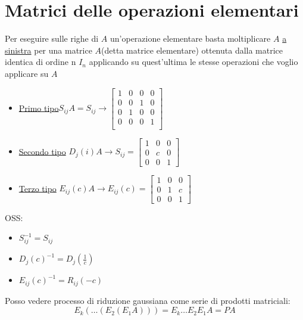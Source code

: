 \section{Matrici delle operazioni elementari}
Per eseguire sulle righe di $A$ un'operazione elementare basta moltiplicare $A$ \underline{a sinistra} per una matrice $A$(detta matrice elementare) ottenuta dalla matrice identica di ordine n $I_n$ applicando su quest'ultima le stesse operazioni che voglio applicare su $A$
\begin{itemize}
	\item \underline{Primo tipo}$S_{ij}A = S_{ij} \rightarrow
		      \begin{bmatrix}
			      1 & 0 & 0 & 0 \\
			      0 & 0 & 1 & 0 \\
			      0 & 1 & 0 & 0 \\
			      0 & 0 & 0 & 1 \\
		      \end{bmatrix} $
	\item \underline{Secondo tipo} $D_j\left( i \right) A \rightarrow S_{ij}=
		      \begin{bmatrix}
			      1 & 0 & 0 \\
			      0 & c & 0 \\
			      0 & 0 & 1
		      \end{bmatrix} $
	\item \underline{Terzo tipo} $E_{ij}\left( c \right) A \rightarrow E_{ij}\left( c \right) =
		      \begin{bmatrix}
			      1 & 0 & 0 \\
			      0 & 1 & c \\
			      0 & 0 & 1
		      \end{bmatrix} $
\end{itemize}
OSS:
\begin{itemize}
	\item $S_{ij}^{-1}= S_{ij}$
	\item $D_j\left( c \right) ^{-1}= D_j\left( \frac{1}{c} \right) $
	\item  $E_{ij}\left( c \right) ^{-1}=R_{ij}\left( -c \right) $
\end{itemize}
\begin{tcolorbox}
	Posso vedere processo di riduzione gaussiana come serie di prodotti matriciali:
	\[
		E_k\left( \ldots \left( E_2 \left( E_1A \right)  \right)  \right) = E_k \ldots E_2 E_1 A = PA
	\]

\end{tcolorbox}


